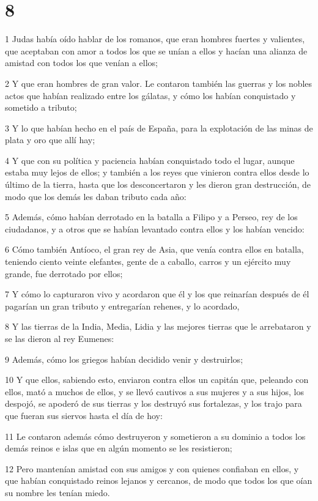 \chapter{8}

\par 1 Judas había oído hablar de los romanos, que eran hombres fuertes y valientes, que aceptaban con amor a todos los que se unían a ellos y hacían una alianza de amistad con todos los que venían a ellos;
\par 2 Y que eran hombres de gran valor. Le contaron también las guerras y los nobles actos que habían realizado entre los gálatas, y cómo los habían conquistado y sometido a tributo;
\par 3 Y lo que habían hecho en el país de España, para la explotación de las minas de plata y oro que allí hay;
\par 4 Y que con su política y paciencia habían conquistado todo el lugar, aunque estaba muy lejos de ellos; y también a los reyes que vinieron contra ellos desde lo último de la tierra, hasta que los desconcertaron y les dieron gran destrucción, de modo que los demás les daban tributo cada año:
\par 5 Además, cómo habían derrotado en la batalla a Filipo y a Perseo, rey de los ciudadanos, y a otros que se habían levantado contra ellos y los habían vencido:
\par 6 Cómo también Antíoco, el gran rey de Asia, que venía contra ellos en batalla, teniendo ciento veinte elefantes, gente de a caballo, carros y un ejército muy grande, fue derrotado por ellos;
\par 7 Y cómo lo capturaron vivo y acordaron que él y los que reinarían después de él pagarían un gran tributo y entregarían rehenes, y lo acordado,
\par 8 Y las tierras de la India, Media, Lidia y las mejores tierras que le arrebataron y se las dieron al rey Eumenes:
\par 9 Además, cómo los griegos habían decidido venir y destruirlos;
\par 10 Y que ellos, sabiendo esto, enviaron contra ellos un capitán que, peleando con ellos, mató a muchos de ellos, y se llevó cautivos a sus mujeres y a sus hijos, los despojó, se apoderó de sus tierras y los destruyó sus fortalezas, y los trajo para que fueran sus siervos hasta el día de hoy:
\par 11 Le contaron además cómo destruyeron y sometieron a su dominio a todos los demás reinos e islas que en algún momento se les resistieron;
\par 12 Pero mantenían amistad con sus amigos y con quienes confiaban en ellos, y que habían conquistado reinos lejanos y cercanos, de modo que todos los que oían su nombre les tenían miedo.
